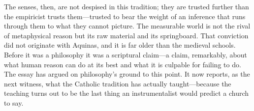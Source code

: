The senses, then, are not despised in this tradition; they are trusted further than the empiricist trusts them---trusted to bear the weight of an inference that runs through them to what they cannot picture. The measurable world is not the rival of metaphysical reason but its raw material and its springboard. That conviction did not originate with Aquinas, and it is far older than the medieval schools. Before it was a philosophy it was a scriptural claim---a claim, remarkably, about what human reason can do at its best and what it is culpable for failing to do. The essay has argued on philosophy's ground to this point. It now reports, as the next witness, what the Catholic tradition has actually taught---because the teaching turns out to be the last thing an instrumentalist would predict a church to say.
